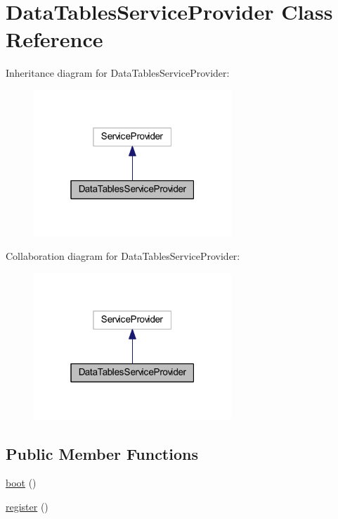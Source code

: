 \hypertarget{classhamburgscleanest_1_1_data_tables_1_1_data_tables_service_provider}{}\section{Data\+Tables\+Service\+Provider Class Reference}
\label{classhamburgscleanest_1_1_data_tables_1_1_data_tables_service_provider}


Inheritance diagram for Data\+Tables\+Service\+Provider\+:\nopagebreak
\begin{figure}[H]
\begin{center}
\leavevmode
\includegraphics[width=211pt]{classhamburgscleanest_1_1_data_tables_1_1_data_tables_service_provider__inherit__graph}
\end{center}
\end{figure}


Collaboration diagram for Data\+Tables\+Service\+Provider\+:\nopagebreak
\begin{figure}[H]
\begin{center}
\leavevmode
\includegraphics[width=211pt]{classhamburgscleanest_1_1_data_tables_1_1_data_tables_service_provider__coll__graph}
\end{center}
\end{figure}
\subsection*{Public Member Functions}
\begin{DoxyCompactItemize}
\item 
\hyperlink{classhamburgscleanest_1_1_data_tables_1_1_data_tables_service_provider_a8814ea4b5beba763c570b4818980814e}{boot} ()
\item 
\hyperlink{classhamburgscleanest_1_1_data_tables_1_1_data_tables_service_provider_acc294a6cc8e69743746820e3d15e3f78}{register} ()
\end{DoxyCompactItemize}


